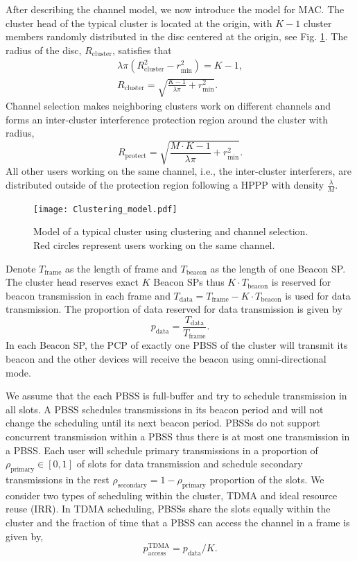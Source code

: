 \documentclass[10pt, conference, letterpaper]{IEEEtran}
\begin{document}
After describing the channel model, we now introduce the model for MAC. 
The cluster head of the typical cluster is located at the origin, with $K-1$ cluster members randomly distributed in the disc centered at the origin, see Fig. \ref{fig:clusteranalysis:model}. The radius of the disc, $R_{\mathrm{cluster}}$, satisfies that 
\begin{align*}
\lambda\pi (R_{\mathrm{cluster}}^2 - r_{\min}^2) = K - 1,\\
R_{\mathrm{cluster}} = \sqrt{\frac{K - 1}{\lambda\pi}+r_{\min}^2}.
\end{align*}
Channel selection makes neighboring clusters work on different channels and forms an inter-cluster interference protection region around the cluster with radius, 
\begin{equation*}
R_{\mathrm{protect}} = \sqrt{\frac{M\cdot K - 1}{\lambda \pi} + r_{\min}^2}.
\end{equation*}
All other users working on the same channel, i.e., the inter-cluster interferers, are distributed outside of the protection region following a HPPP with density $\frac{\lambda}{M}$.

\begin{figure}
	\centering
	\texttt{[image: Clustering\_model.pdf]}
	\caption{Model of a typical cluster using clustering and channel selection. Red circles represent users working on the same channel.}
	\label{fig:clusteranalysis:model}
\end{figure}

Denote $T_{\mathrm{frame}}$ as the length of frame and $T_{\mathrm{beacon}}$ as the length of one Beacon SP. The cluster head reserves exact $K$ Beacon SPs thus $K\cdot T_{\mathrm{beacon}}$ is reserved for beacon transmission in each frame and $T_{\mathrm{data}} = T_{\mathrm{frame}} - K\cdot T_{\mathrm{beacon}}$ is used for data transmission. The proportion of data reserved for data transmission is given by
\begin{equation*}
p_{\mathrm{data}} = \frac{T_{\mathrm{data}}}{T_{\mathrm{frame}}}.
\end{equation*}
In each Beacon SP, the PCP of exactly one PBSS of the cluster will transmit its beacon and the other devices will receive the beacon using omni-directional mode. 

We assume that the each PBSS is full-buffer and try to schedule transmission in all slots. A PBSS schedules transmissions in its beacon period and will not change the scheduling until its next beacon period. PBSSs do not support concurrent transmission within a PBSS thus there is at most one transmission in a PBSS. Each user will schedule primary transmissions in a proportion of $\rho_{\mathrm{primary}}\in[0,1]$ of slots for data transmission and schedule secondary transmissions in the rest $\rho_{\mathrm{secondary}} =1 - \rho_{\mathrm{primary}}$ proportion of the slots. 
We consider two types of scheduling within the cluster, TDMA and ideal resource reuse (IRR). In TDMA scheduling, PBSSs share the slots equally within the cluster and the fraction of time that a PBSS can access the channel in a frame is given by, 
\begin{equation*}
p_{\mathrm{access}}^{\mathrm{TDMA}} = p_{\mathrm{data}}/K.
\end{equation*}
\end{document}
